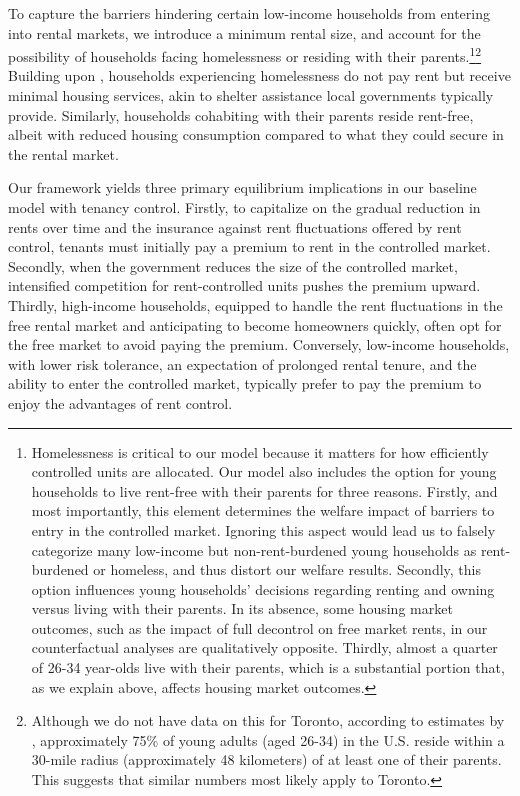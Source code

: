 \documentclass[parskip=full]{article}
\begin{document}
To capture the barriers hindering certain low-income households from entering into rental markets, we introduce a minimum rental size, and account for the possibility of households facing homelessness or residing with their parents.\footnote{Homelessness is critical to our model because it matters for how efficiently controlled units are allocated. Our model also includes the option for young households to live rent-free with their parents for three reasons. Firstly, and most importantly, this element determines the welfare impact of barriers to entry in the controlled market. Ignoring this aspect would lead us to falsely categorize many low-income but non-rent-burdened young households as rent-burdened or homeless, and thus distort our welfare results. Secondly, this option influences young households' decisions regarding renting and owning versus living with their parents. In its absence, some housing market outcomes, such as the impact of full decontrol on free market rents, in our counterfactual analyses are qualitatively opposite. Thirdly, almost a quarter of 26-34 year-olds live with their parents, which is a substantial portion that, as we explain above, affects housing market outcomes.}\footnote{Although we do not have data on this for Toronto, according to estimates by \citet{spatial_distance-2020}, approximately 75\% of young adults (aged 26-34) in the U.S. reside within a 30-mile radius (approximately 48 kilometers) of at least one of their parents. This suggests that similar numbers most likely apply to Toronto.} Building upon \citet{az-2024}, households experiencing homelessness do not pay rent but receive minimal housing services, akin to shelter assistance local governments typically provide. Similarly, households cohabiting with their parents reside rent-free, albeit with reduced housing consumption compared to what they could secure in the rental market.

Our framework yields three primary equilibrium implications in our baseline model with tenancy control. Firstly, to capitalize on the gradual reduction in rents over time and the insurance against rent fluctuations offered by rent control, tenants must initially pay a premium to rent in the controlled market. Secondly, when the government reduces the size of the controlled market, intensified competition for rent-controlled units pushes the premium upward. Thirdly, high-income households, equipped to handle the rent fluctuations in the free rental market and anticipating to become homeowners quickly, often opt for the free market to avoid paying the premium. Conversely, low-income households, with lower risk tolerance, an expectation of prolonged rental tenure, and the ability to enter the controlled market, typically prefer to pay the premium to enjoy the advantages of rent control.
\end{document}
